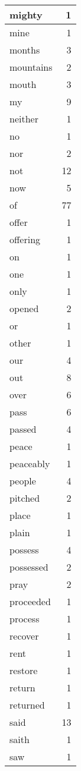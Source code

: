 \begin{center}
\begin{longtable}{l|r}
mighty & 1\\ \hline 
mine & 1\\ \hline 
months & 3\\ \hline 
mountains & 2\\ \hline 
mouth & 3\\ \hline 
my & 9\\ \hline 
neither & 1\\ \hline 
no & 1\\ \hline 
nor & 2\\ \hline 
not & 12\\ \hline 
now & 5\\ \hline 
of & 77\\ \hline 
offer & 1\\ \hline 
offering & 1\\ \hline 
on & 1\\ \hline 
one & 1\\ \hline 
only & 1\\ \hline 
opened & 2\\ \hline 
or & 1\\ \hline 
other & 1\\ \hline 
our & 4\\ \hline 
out & 8\\ \hline 
over & 6\\ \hline 
pass & 6\\ \hline 
passed & 4\\ \hline 
peace & 1\\ \hline 
peaceably & 1\\ \hline 
people & 4\\ \hline 
pitched & 2\\ \hline 
place & 1\\ \hline 
plain & 1\\ \hline 
possess & 4\\ \hline 
possessed & 2\\ \hline 
pray & 2\\ \hline 
proceeded & 1\\ \hline 
process & 1\\ \hline 
recover & 1\\ \hline 
rent & 1\\ \hline 
restore & 1\\ \hline 
return & 1\\ \hline 
returned & 1\\ \hline 
said & 13\\ \hline 
saith & 1\\ \hline 
saw & 1\\ \hline 

\end{longtable}
\end{center}
